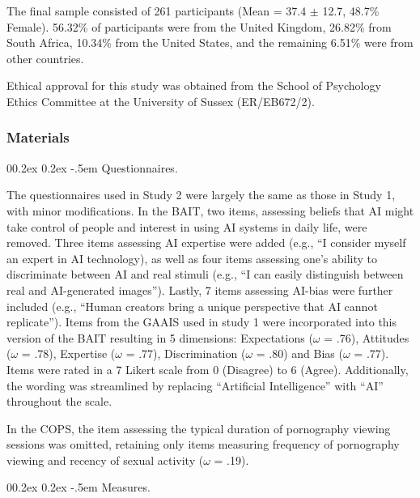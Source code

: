 \documentclass[
  jou,
  floatsintext,
  longtable,
  nolmodern,
  notxfonts,
  notimes,
  colorlinks=true,linkcolor=blue,citecolor=blue,urlcolor=blue]{apa7}
\makeatletter
\renewcommand{\paragraph}{\@startsection{paragraph}{4}{\parindent}%
	{0\baselineskip \@plus 0.2ex \@minus 0.2ex}%
	{-.5em}%
	{\normalfont\normalsize\bfseries\typesectitle}}
\makeatother
\begin{document}
The final sample consisted of 261 participants (Mean = 37.4 \(\pm\)
12.7, 48.7\% Female). 56.32\% of participants were from the United
Kingdom, 26.82\% from South Africa, 10.34\% from the United States, and
the remaining 6.51\% were from other countries.

Ethical approval for this study was obtained from the School of
Psychology Ethics Committee at the University of Sussex (ER/EB672/2).

\subsubsection{Materials}\label{materials-1}

\paragraph{Questionnaires.}\label{questionnaires-1}

The questionnaires used in Study 2 were largely the same as those in
Study 1, with minor modifications. In the BAIT, two items, assessing
beliefs that AI might take control of people and interest in using AI
systems in daily life, were removed. Three items assessing AI expertise
were added (e.g., ``I consider myself an expert in AI technology), as
well as four items assessing one's ability to discriminate between AI
and real stimuli (e.g., ``I can easily distinguish between real and
AI-generated images''). Lastly, 7 items assessing AI-bias were further
included (e.g., ``Human creators bring a unique perspective that AI
cannot replicate''). Items from the GAAIS used in study 1 were
incorporated into this version of the BAIT resulting in 5 dimensions:
Expectations (\(\omega\) = .76), Attitudes (\(\omega\) = .78), Expertise
(\(\omega\) = .77), Discrimination (\(\omega\) = .80) and Bias
(\(\omega\) = .77).\\
Items were rated in a 7 Likert scale from 0 (Disagree) to 6 (Agree).
Additionally, the wording was streamlined by replacing ``Artificial
Intelligence'' with ``AI'' throughout the scale.

In the COPS, the item assessing the typical duration of pornography
viewing sessions was omitted, retaining only items measuring frequency
of pornography viewing and recency of sexual activity (\(\omega\) =
.19).

\paragraph{Measures.}\label{measures}
\end{document}
